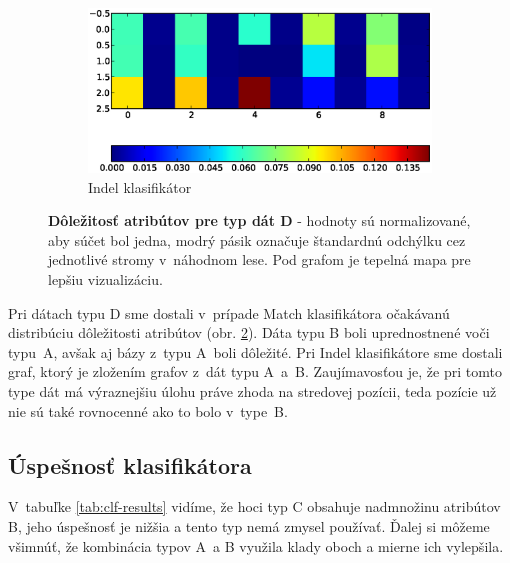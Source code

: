 \begin{figure}[htbp]
\begin{subfigure}[t]{0.4\textwidth}
                \includegraphics[width=\textwidth]{images/clf_fi/randomforest_combined_5_indel_heatmap}
                \caption{Indel klasifikátor}
                \label{fig:datatype4-i}
        \end{subfigure}
        \caption[Dôležitosť atribútov pre typ dát D]{
        \textbf{Dôležitosť atribútov pre typ dát D} - hodnoty sú normalizované, aby súčet bol jedna, modrý pásik označuje štandardnú odchýlku cez jednotlivé stromy v~náhodnom lese.
        Pod grafom je tepelná mapa pre lepšiu vizualizáciu.}
        \label{fig:datatype4}
\end{figure}


Pri dátach typu D sme dostali v~prípade Match klasifikátora očakávanú distribúciu dôležitosti atribútov (obr. \ref{fig:datatype4}). Dáta typu B boli uprednostnené voči typu~A, avšak aj bázy z~typu A~boli dôležité. Pri Indel klasifikátore sme dostali graf, ktorý je zložením grafov z~dát typu A~a~B. Zaujímavosťou je, že pri tomto type dát má výraznejšiu úlohu práve zhoda na stredovej pozícii, teda pozície už nie sú také rovnocenné ako to bolo v~type~B.

\FloatBarrier

\subsection{Úspešnosť klasifikátora}

V~tabuľke \ref{tab:clf-results} vidíme, že hoci typ C obsahuje nadmnožinu atribútov B, jeho úspešnosť je nižšia a tento typ nemá zmysel používať. Ďalej si môžeme všimnúť, že kombinácia typov A~a B využila klady oboch a mierne ich vylepšila.


